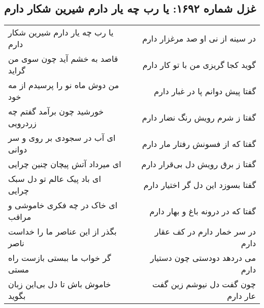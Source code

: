 \begin{center}
\section*{غزل شماره ۱۶۹۲: یا رب چه یار دارم شیرین شکار دارم}
\label{sec:1692}
\begin{longtable}{l p{0.5cm} r}
یا رب چه یار دارم شیرین شکار دارم
&&
در سینه از نی او صد مرغزار دارم
\\
قاصد به خشم آید چون سوی من گراید
&&
گوید کجا گریزی من با تو کار دارم
\\
من دوش ماه نو را پرسیدم از مه خود
&&
گفتا پیش دوانم پا در غبار دارم
\\
خورشید چون برآمد گفتم چه زردرویی
&&
گفتا ز شرم رویش رنگ نضار دارم
\\
ای آب در سجودی بر روی و سر دوانی
&&
گفتا که از فسونش رفتار مار دارم
\\
ای میرداد آتش پیچان چنین چرایی
&&
گفتا ز برق رویش دل بی‌قرار دارم
\\
ای باد پیک عالم تو دل سبک چرایی
&&
گفتا بسوزد این دل گر اختیار دارم
\\
ای خاک در چه فکری خاموشی و مراقب
&&
گفتا که در درونه باغ و بهار دارم
\\
بگذر از این عناصر ما را خداست ناصر
&&
در سر خمار دارم در کف عقار دارم
\\
گر خواب ما ببستی بازست راه مستی
&&
می دردهد دودستی چون دستیار دارم
\\
خاموش باش تا دل بی‌این زبان بگوید
&&
چون گفت دل نیوشم زین گفت عار دارم
\\
\end{longtable}
\end{center}
